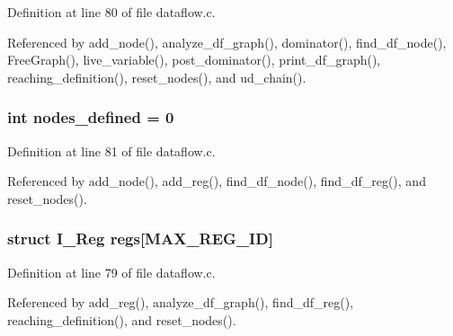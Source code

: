 Definition at line 80 of file dataflow.c.

Referenced by add\_\-node(), analyze\_\-df\_\-graph(), dominator(), find\_\-df\_\-node(), Free\-Graph(), live\_\-variable(), post\_\-dominator(), print\_\-df\_\-graph(), reaching\_\-definition(), reset\_\-nodes(), and ud\_\-chain().
\subsubsection{\setlength{\rightskip}{0pt plus 5cm}int \bf{nodes\_\-defined} = 0\hspace{0.3cm}{\tt  [static]}}\label{dataflow_8c_b09601288459e665bd4d0c07d76d21aa}




Definition at line 81 of file dataflow.c.

Referenced by add\_\-node(), add\_\-reg(), find\_\-df\_\-node(), find\_\-df\_\-reg(), and reset\_\-nodes().
\subsubsection{\setlength{\rightskip}{0pt plus 5cm}struct \bf{I\_\-Reg} \bf{regs}[MAX\_\-REG\_\-ID]\hspace{0.3cm}{\tt  [static]}}\label{dataflow_8c_4e995b4ebf5203cec7882557e291e9b9}




Definition at line 79 of file dataflow.c.

Referenced by add\_\-reg(), analyze\_\-df\_\-graph(), find\_\-df\_\-reg(), reaching\_\-definition(), and reset\_\-nodes().